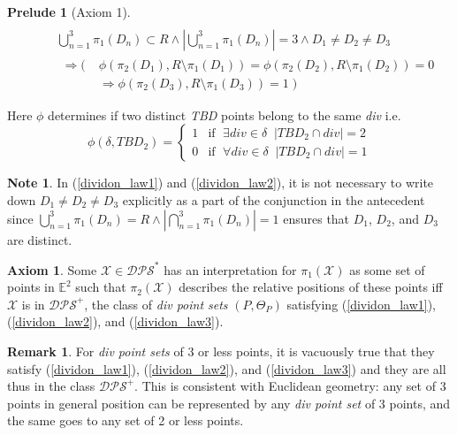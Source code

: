 \documentclass[11pt, oneside]{article}      %
\theoremstyle{definition}
\newtheorem{ax}{Axiom}
\newtheorem*{note}{Note}
\numberwithin{equation}{section}
\newtheorem*{remark}{Remark}
\newcommand{\reff}[1]{(\ref{#1})}
\theoremstyle{c}
\newtheorem*{prelude}{Prelude}
\begin{document}
\begin{prelude}[Axiom 1]
\begin{align}
\begin{split}
\begin{aligned}
&\qquad \bigcup_{n=1}^{3} \pi_1(D_n) \subset R \land |\bigcup_{n=1}^{3} \pi_1(D_n)| = 3 \land  D_1\not=D_2\not=D_3\\
&\begin{aligned}\qquad \Rightarrow ( \; &\phi(\pi_2(D_1),R \setminus \pi_1(D_1)) = \phi(\pi_2(D_2),R  \setminus \pi_1(D_2)) = 0 \\
&\Rightarrow \phi(\pi_2(D_3),R  \setminus \pi_1(D_3))  = 1 \; ) \\
\end{aligned} \end{aligned} \end{split}
\end{align}
Here $\phi$ determines if two distinct \textit{TBD} points belong to the same \textit{div} i.e.
\begin{equation}\label{phi}
    \phi(\delta,TBD_2)=
\begin{cases}
   1 & \text{if } \;   \exists div \in \delta \; \; |TBD_2 \cap div| = 2 \\
    0 & \text{if }\;  \forall div \in \delta \; \; |TBD_2 \cap div| = 1
\end{cases} 
\end{equation}
\end{prelude}
\begin{note}
In \reff{dividon_law1} and \reff{dividon_law2}, it is not necessary to write down $D_1\not=D_2\not=D_3$ explicitly as a part of the conjunction in the antecedent since $\bigcup_{n=1}^{3} \pi_1(D_n) = R \land |\bigcap_{n=1}^{3} \pi_1(D_n)|= 1$ ensures that $D_1$, $D_2$, and $D_3$ are distinct.
\end{note}

\begin{ax} Some $\mathscr{X} \in \mathscr{DPS}^*$ has an interpretation for $\pi_1(\mathscr{X})$ as some set of points in $\mathbb{E}^2$ such that $\pi_2(\mathscr{X})$ describes the relative positions of these points iff $\mathscr{X}$ is in $\mathscr{DPS}^+$, the class of \textit{div point sets} $(P,\Theta_P)$ satisfying \reff{dividon_law1}, \reff{dividon_law2}, and \reff{dividon_law3}.
\end{ax}
\begin{remark}
For \textit{div point sets} of 3 or less points, it is vacuously true that they satisfy \reff{dividon_law1}, \reff{dividon_law2}, and \reff{dividon_law3} and they are all thus in the class $\mathscr{DPS}^+$. This is consistent with Euclidean geometry: any set of 3 points in general position can be represented by any \textit{div point set} of 3 points, and the same goes to any set of 2 or less points.
\end{remark}
\end{document}
